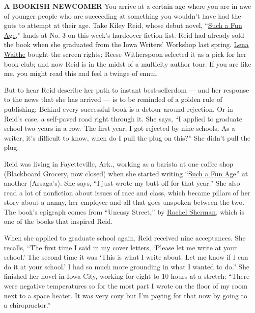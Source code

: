 \textbf{A BOOKISH NEWCOMER} You arrive at a certain age where you are in
awe of younger people who are succeeding at something you wouldn't have
had the guts to attempt at their age. Take Kiley Reid, whose debut
novel,
``\href{https://www.nytimes3xbfgragh.onion/2019/12/28/books/kiley-reid-such-a-fun-age.html}{Such
a Fun Age},'' lands at No. 3 on this week's hardcover fiction list. Reid
had already sold the book when she graduated from the Iowa Writers'
Workshop last spring.
\href{https://deadline.com/2018/08/lena-waithe-such-a-fun-age-kiley-reid-sight-unseen-coming-of-age-novel-1202454266/}{Lena
Waithe} bought the screen rights; Reese Witherspoon selected it as a
pick for her book club; and now Reid is in the midst of a multicity
author tour. If you are like me, you might read this and feel a twinge
of ennui.

But to hear Reid describe her path to instant best-sellerdom --- and her
response to the news that she has arrived --- is to be reminded of a
golden rule of publishing: Behind every successful book is a detour
around rejection. Or in Reid's case, a self-paved road right through it.
She says, ``I applied to graduate school two years in a row. The first
year, I got rejected by nine schools. As a writer, it's difficult to
know, when do I pull the plug on this?'' She didn't pull the plug.

Reid was living in Fayetteville, Ark., working as a barista at one
coffee shop (Blackboard Grocery, now closed) when she started writing
``\href{https://www.nytimes3xbfgragh.onion/2019/12/31/books/review/such-a-fun-age-kiley-reid.html}{Such
a Fun Age}'' at another (Arsaga's). She says, ``I just wrote my butt off
for that year.'' She also read a lot of nonfiction about issues of race
and class, which became pillars of her story about a nanny, her employer
and all that goes unspoken between the two. The book's epigraph comes
from ``Uneasy Street,'' by
\href{https://www.nytimes3xbfgragh.onion/2017/09/08/opinion/sunday/what-the-rich-wont-tell-you.html}{Rachel
Sherman}, which is one of the books that inspired Reid.

When she applied to graduate school again, Reid received nine
acceptances. She recalls, ``The first time I said in my cover letters,
`Please let me write at your school.' The second time it was `This is
what I write about. Let me know if I can do it at your school.' I had so
much more grounding in what I wanted to do.'' She finished her novel in
Iowa City, working for eight to 10 hours at a stretch: ``There were
negative temperatures so for the most part I wrote on the floor of my
room next to a space heater. It was very cozy but I'm paying for that
now by going to a chiropractor.''

